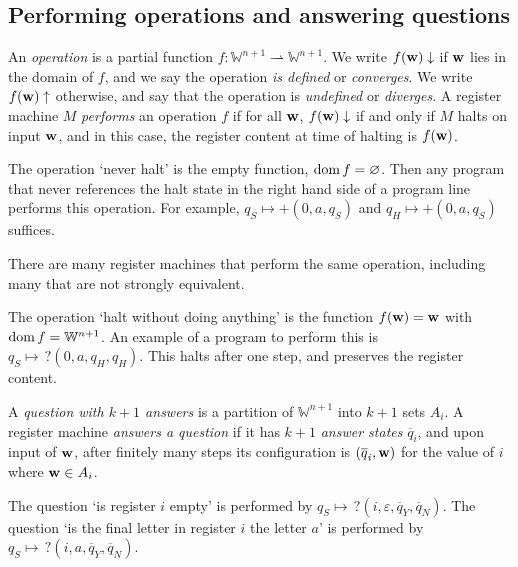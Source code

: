 \subsection{Performing operations and answering questions}
\begin{definition}
	An \emph{operation} is a partial function \( f \colon \mathbb W^{n+1} \rightharpoonup \mathbb W^{n+1} \).
	We write \( f(\vb w) \downarrow \) if \( \vb w \) lies in the domain of \( f \), and we say the operation \emph{is defined} or \emph{converges}.
	We write \( f(\vb w) \uparrow \) otherwise, and say that the operation is \emph{undefined} or \emph{diverges}.
	A register machine \( M \) \emph{performs} an operation \( f \) if for all \( \vb w \), \( f(\vb w) \downarrow \) if and only if \( M \) halts on input \( \vb w \), and in this case, the register content at time of halting is \( f(\vb w) \).
\end{definition}
\begin{example}
	The operation `never halt' is the empty function, \( \operatorname{dom} f = \varnothing \).
	Then any program that never references the halt state in the right hand side of a program line performs this operation.
	For example, \( q_S \mapsto +(0,a,q_S) \) and \( q_H \mapsto +(0,a,q_S) \) suffices.
\end{example}
\begin{remark}
	There are many register machines that perform the same operation, including many that are not strongly equivalent.
\end{remark}
\begin{example}
	The operation `halt without doing anything' is the function \( f(\vb w) = \vb w \) with \( \operatorname{dom} f = \mathbb W^{n+1} \).
	An example of a program to perform this is \( q_S \mapsto\, ?(0,a,q_H,q_H) \).
	This halts after one step, and preserves the register content.
\end{example}
\begin{definition}
	A \emph{question with \( k+1 \) answers} is a partition of \( \mathbb W^{n+1} \) into \( k + 1 \) sets \( A_i \).
	A register machine \emph{answers a question} if it has \( k + 1 \) \emph{answer states} \( \overline q_i \), and upon input of \( \vb w \), after finitely many steps its configuration is \( (\overline q_i, \vb w) \) for the value of \( i \) where \( \vb w \in A_i \).
\end{definition}
\begin{example}
	The question `is register \( i \) empty' is performed by \( q_S \mapsto\, ?(i, \varepsilon, \overline q_Y, \overline q_N) \).
	The question `is the final letter in register \( i \) the letter \( a \)' is performed by \( q_S \mapsto\, ?(i, a, \overline q_Y, \overline q_N) \).
\end{example}
